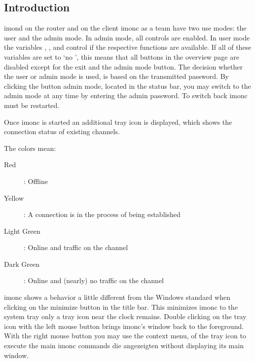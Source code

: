 
  \subsection{Introduction}

  imond on the router and on the client imonc as a team have
  two use modes: the user and the admin mode. In admin mode, all
  controls are enabled. In user mode the variables
  , , 
   and 
  control if the respective functions are available. If all of these
  variables are set to `no ', this means that all buttons in the overview page
  are disabled except for the exit and the admin mode button. The
  decision whether the user or admin mode is used, is based on the
  transmitted password. By clicking the button admin mode, located in the
  status bar, you may switch to the admin mode at any time by entering the
  admin password. To switch back imonc must be restarted.

  Once imonc is started an additional tray icon is displayed, which
  shows the connection status of existing channels.

  The colors mean:
  \begin{description}
    \item[Red]: Offline
    \item[Yellow]: A connection is in the process of being established
    \item[Light Green]: Online and traffic on the channel
    \item[Dark Green]: Online and (nearly) no traffic on the channel
  \end{description}

  \noindent imonc shows a behavior a little different from the Windows standard
  when clicking on the minimize button in the title bar. This minimizes imonc
  to the system tray only a tray icon near the clock remains. Double clicking
  on the tray icon with the left mouse button brings imonc's window back to
  the foreground. With the right mouse button you may use the context menu,
  of the tray icon to execute the main imonc commands die angezeigten
         without displaying its
  main window.

